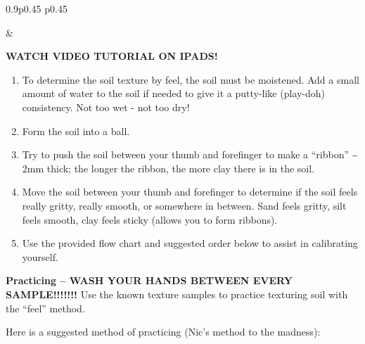 \documentclass[
  letterpaper,
  twocolumn,
  portrait]{scrbook}
\begin{document}
\begin{table}[h!]
\begin{centerbox}
\begin{threeparttable}
\begin{tabularx}{0.9\textwidth}{p{} p{}}

 &
 \tabularnewline[-0.5pt]


\end{tabularx}
\end{threeparttable}\par\end{centerbox}

\end{table}
 

\textbf{WATCH VIDEO TUTORIAL ON IPADS!}

\begin{enumerate}
\def\labelenumi{\arabic{enumi}.}
\item
  To determine the soil texture by feel, the soil must be moistened. Add
  a small amount of water to the soil if needed to give it a putty-like
  (play-doh) consistency. Not too wet - not too dry!
\item
  Form the soil into a ball.
\item
  Try to push the soil between your thumb and forefinger to make a
  ``ribbon'' \textasciitilde{} 2mm thick; the longer the ribbon, the
  more clay there is in the soil.
\item
  Move the soil between your thumb and forefinger to determine if the
  soil feels really gritty, really smooth, or somewhere in between. Sand
  feels gritty, silt feels smooth, clay feels sticky (allows you to form
  ribbons).
\item
  Use the provided flow chart and suggested order below to assist in
  calibrating yourself.
\end{enumerate}

\textbf{Practicing -- WASH YOUR HANDS BETWEEN EVERY SAMPLE!!!!!!!} Use
the known texture samples to practice texturing soil with the ``feel''
method.

Here is a suggested method of practicing (Nic's method to the madness):
\end{document}
